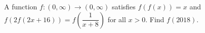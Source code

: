 A function $f:(0,\infty)\to(0,\infty)$ satisfies $f(f(x))=x$ and $f(2f(2x+16))=f(\dfrac{1}{x+8})$ for all $x>0$. Find $f(2018)$.
